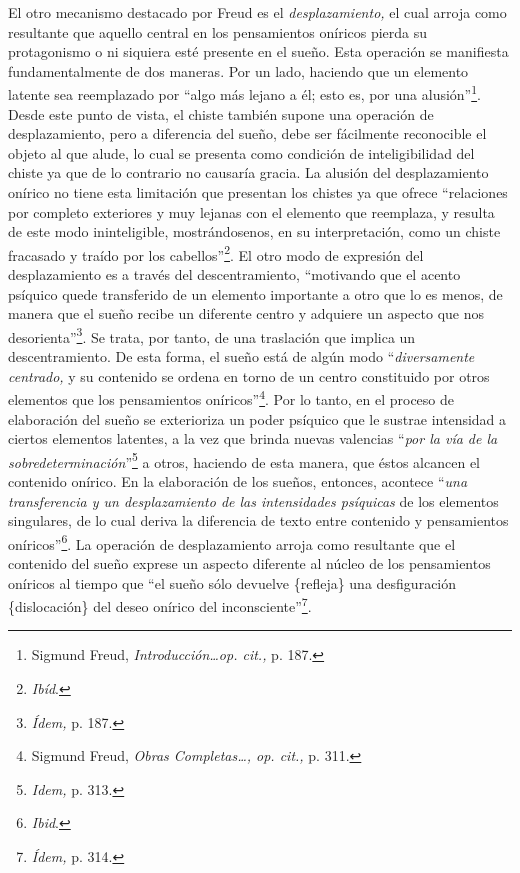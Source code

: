 El otro mecanismo destacado por Freud es el \emph{desplazamiento,} el cual arroja como resultante que aquello central en los pensamientos oníricos pierda su protagonismo o ni siquiera esté presente en el sueño. Esta operación se manifiesta fundamentalmente de dos maneras. Por un lado, haciendo que un elemento latente sea reemplazado por \enquote{algo más lejano a él; esto es, por una alusión}\footnote{Sigmund Freud, \emph{Introducción\ldots op. cit.,} p. 187.}. Desde este punto de vista, el chiste también supone una operación de desplazamiento, pero a diferencia del sueño, debe ser fácilmente reconocible el objeto al que alude, lo cual se presenta como condición de inteligibilidad del chiste ya que de lo contrario no causaría gracia. La alusión del desplazamiento onírico no tiene esta limitación que presentan los chistes ya que ofrece \enquote{relaciones por completo exteriores y muy lejanas con el elemento que reemplaza, y resulta de este modo ininteligible, mostrándosenos, en su interpretación, como un chiste fracasado y traído por los cabellos}\footnote{\emph{Ibíd}.}. El otro modo de expresión del desplazamiento es a través del descentramiento, \enquote{motivando que el acento psíquico quede transferido de un elemento importante a otro que lo es menos, de manera que el sueño recibe un diferente centro y adquiere un aspecto que nos desorienta}\footnote{\emph{Ídem,} p. 187.}. Se trata, por tanto, de una traslación que implica un descentramiento. De esta forma, el sueño está de algún modo \enquote{\emph{diversamente centrado,} y su contenido se ordena en torno de un centro constituido por otros elementos que los pensamientos oníricos}\footnote{Sigmund Freud, \emph{Obras Completas\ldots, op. cit.,} p. 311.}. Por lo tanto, en el proceso de elaboración del sueño se exterioriza un poder psíquico que le sustrae intensidad a ciertos elementos latentes, a la vez que brinda nuevas valencias \enquote{\emph{por la vía de la sobredeterminación}}\footnote{\emph{Idem,} p. 313.} a otros, haciendo de esta manera, que éstos alcancen el contenido onírico. En la elaboración de los sueños, entonces, acontece \enquote{\emph{una transferencia y un desplazamiento de las intensidades psíquicas} de los elementos singulares, de lo cual deriva la diferencia de texto entre contenido y pensamientos oníricos}\footnote{\emph{Ibid}.}. La operación de desplazamiento arroja como resultante que el contenido del sueño exprese un aspecto diferente al núcleo de los pensamientos oníricos al tiempo que \enquote{el sueño sólo devuelve \{refleja\} una desfiguración \{dislocación\} del deseo onírico del inconsciente}\footnote{\emph{Ídem,} p. 314.}.

